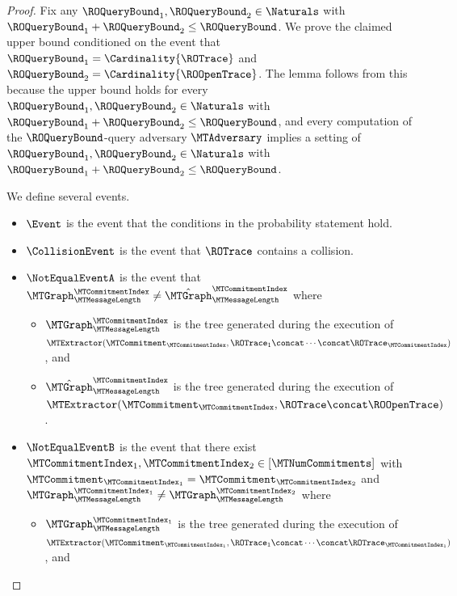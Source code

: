 \begin{proof}
Fix any $\ROQueryBound_{1},\ROQueryBound_{2} \in \Naturals$ with $\ROQueryBound_{1} + \ROQueryBound_{2} \leq \ROQueryBound$. We prove the claimed upper bound conditioned on the event that $\ROQueryBound_{1} = \Cardinality{\ROTrace}$ and $\ROQueryBound_{2} = \Cardinality{\ROOpenTrace}$. The lemma follows from this because the upper bound holds for every $\ROQueryBound_{1},\ROQueryBound_{2} \in \Naturals$ with $\ROQueryBound_{1} + \ROQueryBound_{2} \leq \ROQueryBound$, and every computation of the $\ROQueryBound$-query adversary $\MTAdversary$ implies a setting of $\ROQueryBound_{1},\ROQueryBound_{2} \in \Naturals$ with $\ROQueryBound_{1} + \ROQueryBound_{2} \leq \ROQueryBound$.

We define several events.
\begin{itemize}[noitemsep]
  \item $\Event$ is the event that the conditions in the probability statement hold.
  \item $\CollisionEvent$ is the event that $\ROTrace$ contains a collision.
  \item $\NotEqualEventA$ is the event that $\MTGraph_{\MTMessageLength}^{\MTCommitmentIndex} \neq \hat{\MTGraph}_{\MTMessageLength}^{\MTCommitmentIndex}$ where
  \begin{itemize}[nosep]
    \item $\MTGraph_{\MTMessageLength}^{\MTCommitmentIndex}$ is the tree generated during the execution of $\MTExtractor(\MTCommitment_{\MTCommitmentIndex},\ROTrace_{1} \concat \cdots \concat \ROTrace_{\MTCommitmentIndex})$, and
    \item $\hat{\MTGraph}_{\MTMessageLength}^{\MTCommitmentIndex}$ is the tree generated during the execution of $\MTExtractor(\MTCommitment_{\MTCommitmentIndex},\ROTrace \concat \ROOpenTrace)$.
  \end{itemize}
  \item $\NotEqualEventB$ is the event that there exist $\MTCommitmentIndex_{1}, \MTCommitmentIndex_{2} \in [\MTNumCommitments]$ with $\MTCommitment_{\MTCommitmentIndex_{1}} = \MTCommitment_{\MTCommitmentIndex_{2}}$ and $\MTGraph_{\MTMessageLength}^{\MTCommitmentIndex_{1}} \neq \MTGraph_{\MTMessageLength}^{\MTCommitmentIndex_{2}}$ where
  \begin{itemize}[nosep]
    \item $\MTGraph_{\MTMessageLength}^{\MTCommitmentIndex_{1}}$ is the tree generated during the execution of $\MTExtractor(\MTCommitment_{\MTCommitmentIndex_{1}},\ROTrace_{1} \concat \cdots \concat \ROTrace_{\MTCommitmentIndex_{1}})$, and

\end{itemize}
\end{itemize}
\end{proof}
